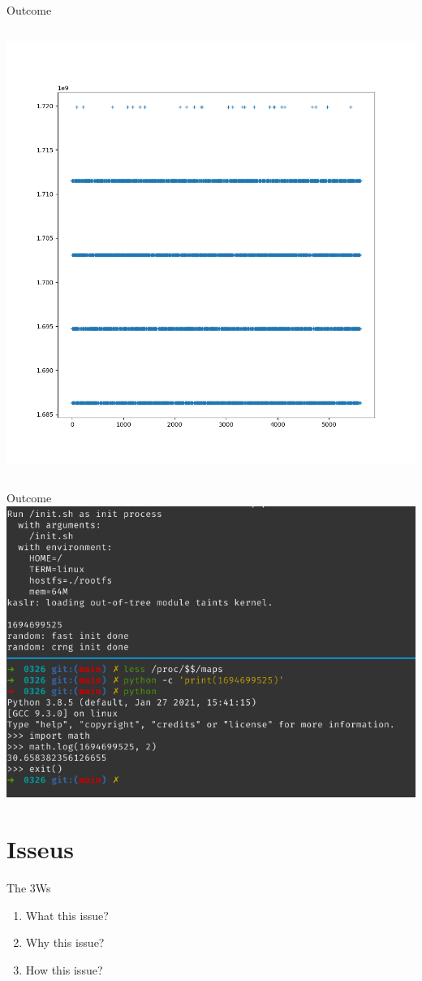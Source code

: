 \documentclass{beamer}
\begin{document}
\begin{frame}{Outcome}
\begin{columns}
\begin{column}{.5\textwidth}
            \centering\includegraphics[width=\textwidth]{kaslr.png}
        \end{column}
    \end{columns}
\end{frame}

\begin{frame}{Outcome}
    \centering\includegraphics[width=.9\textwidth]{k32_1G.png}
\end{frame}

\section{Isseus}
\begin{frame}{The 3Ws}
    \begin{enumerate}
        \item What this issue?
        \item Why this issue?
        \item How this issue?
    \end{enumerate}
\end{frame}
\end{document}
